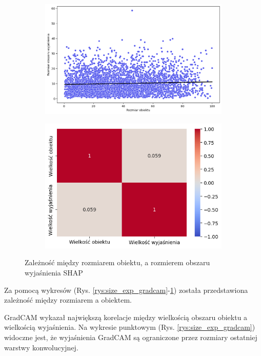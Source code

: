 \begin{figure}[h]
	\centering
	\begin{subfigure}[b]{0.45\textwidth}
		\includegraphics[width=.9\textwidth]{img/size_exp_shap}
	\end{subfigure}
	\begin{subfigure}[b]{0.45\textwidth}
		\includegraphics[width=.9\textwidth]{img/size_exp_shap_corr}
	\end{subfigure}
	\caption{Zależność między rozmiarem obiektu, a rozmierem obszaru wyjaśnienia SHAP}
	\label{rys:size_exp_shap}
\end{figure}

Za pomocą wykresów (Rys. \ref{rys:size_exp_gradcam}-\ref{rys:size_exp_shap}) została przedstawiona zależność między rozmiarem a obiektem.

GradCAM wykazał największą korelacje między wielkością obszaru obiektu a wielkością wyjaśnienia.
Na wykresie punktowym (Rys. \ref{rys:size_exp_gradcam}) widoczne jest, że wyjaśnienia GradCAM są ograniczone przez rozmiary ostatniej warstwy konwolucyjnej.

